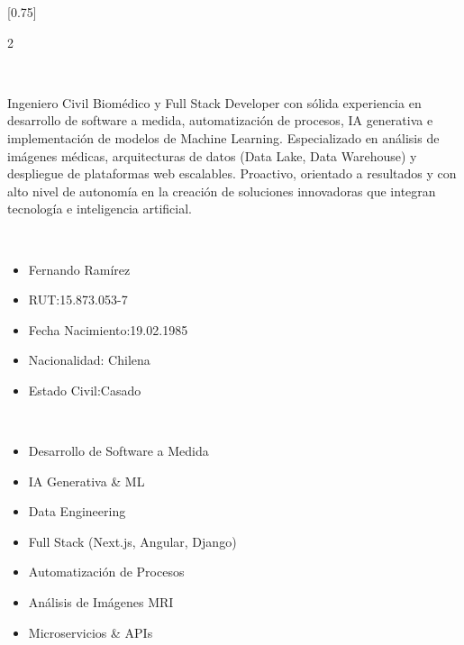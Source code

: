 \documentclass[lighthipster]{simplehipstercv}
\begin{document}
\setlength{\columnsep}{1.5cm}
[0.75]
\begin{paracol}{2}

\paracolbackgroundoptions



\footnotesize
{\setasidefontcolour
\flushright
\begin{center}
\end{center}
\begin{center}
\\[0.5em]
\end{center}
\begin{justify}
{\footnotesize
Ingeniero Civil Biomédico y Full Stack Developer con sólida experiencia en desarrollo de software a medida, automatización de procesos, IA generativa e implementación de modelos de Machine Learning. Especializado en análisis de imágenes médicas, arquitecturas de datos (Data Lake, Data Warehouse) y despliegue de plataformas web escalables. Proactivo, orientado a resultados y con alto nivel de autonomía en la creación de soluciones innovadoras que integran tecnología e inteligencia artificial.
}
\end{justify}
\begin{center}
 \\[0.5em]
\end{center}
\begin{itemize}
    \item Fernando Ramírez
    \item RUT:15.873.053-7
    \item Fecha Nacimiento:19.02.1985
    \item Nacionalidad: Chilena
    \item Estado Civil:Casado
\end{itemize}
 
\begin{center}
\\[0.5em]
\end{center}
\begin{itemize}
    \item Desarrollo de Software a Medida
    \item IA Generativa \& ML
    \item Data Engineering
    \item Full Stack (Next.js, Angular, Django)
    \item Automatización de Procesos
    \item Análisis de Imágenes MRI
    \item Microservicios \& APIs
\end{itemize}

}
\end{paracol}
\end{document}
